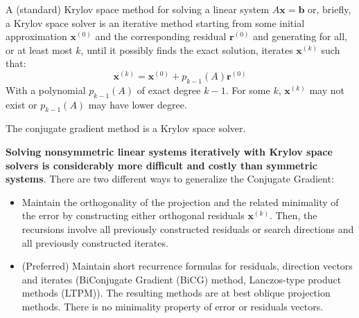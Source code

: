 \begin{definitionbox}
    A (standard) Krylov space method for solving a linear system $A\mathbf{x} = \mathbf{b}$ or, briefly, a Krylov space solver is an iterative method starting from some initial approximation $\mathbf{x}^{\left(0\right)}$ and the corresponding residual $\mathbf{r}^{\left(0\right)}$ and generating for all, or at least most $k$, until it possibly finds the exact solution, iterates $\mathbf{x}^{\left(k\right)}$ such that:
    \begin{equation}
        \mathbf{x}^{\left(k\right)} = \mathbf{x}^{\left(0\right)} + p_{k-1} \left(A\right)\mathbf{r}^{\left(0\right)}
    \end{equation}
    With a polynomial $p_{k-1}\left(A\right)$ of exact degree $k-1$. For some $k$, $\mathbf{x}^{\left(k\right)}$ may not exist or $p_{k-1}\left(A\right)$ may have lower degree.
\end{definitionbox}

\noindent
The conjugate gradient method is a Krylov space solver.

\highspace
\textbf{Solving nonsymmetric linear systems iteratively with Krylov space solvers is considerably more difficult and costly than symmetric systems}. There are two different ways to generalize the Conjugate Gradient:
\begin{itemize}
    \item Maintain the orthogonality of the projection and the related minimality of the error by constructing either orthogonal residuals $\mathbf{x}^{\left(k\right)}$. Then, the recursions involve all previously constructed residuals or search directions and all previously constructed iterates.
    \item (Preferred) Maintain short recurrence formulas for residuals, direction vectors and iterates (BiConjugate Gradient (BiCG) method, Lanczos-type product methods (LTPM)). The resulting methods are at best oblique projection methods. There is no minimality property of error or residuals vectors.
\end{itemize}